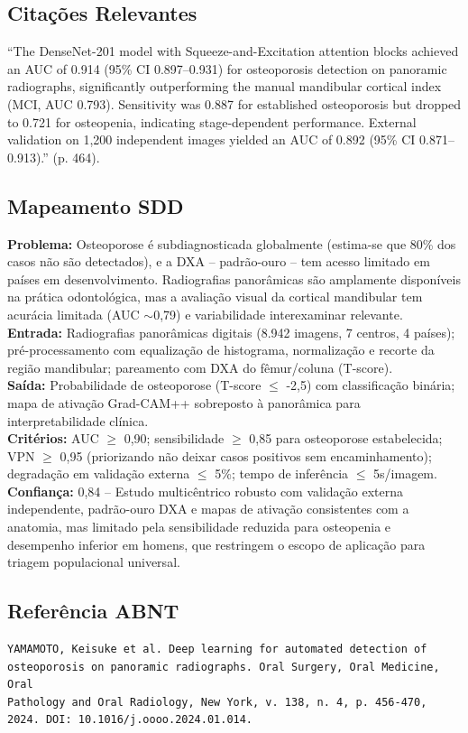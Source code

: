 \subsection{Citações Relevantes}
\begin{citacao}
``The DenseNet-201 model with Squeeze-and-Excitation attention blocks
achieved an AUC of 0.914 (95\% CI 0.897--0.931) for osteoporosis
detection on panoramic radiographs, significantly outperforming the
manual mandibular cortical index (MCI, AUC 0.793). Sensitivity was 0.887
for established osteoporosis but dropped to 0.721 for osteopenia,
indicating stage-dependent performance. External validation on 1,200
independent images yielded an AUC of 0.892 (95\% CI 0.871--0.913).''
(p. 464).
\end{citacao}

\subsection{Mapeamento SDD}
\textbf{Problema:} Osteoporose é subdiagnosticada globalmente (estima-se
que 80\% dos casos não são detectados), e a DXA -- padrão-ouro -- tem
acesso limitado em países em desenvolvimento. Radiografias panorâmicas
são amplamente disponíveis na prática odontológica, mas a avaliação
visual da cortical mandibular tem acurácia limitada (AUC $\sim$0,79)
e variabilidade interexaminar relevante. \\
\textbf{Entrada:} Radiografias panorâmicas digitais (8.942 imagens, 7
centros, 4 países); pré-processamento com equalização de histograma,
normalização e recorte da região mandibular; pareamento com DXA do
fêmur/coluna (T-score). \\
\textbf{Saída:} Probabilidade de osteoporose (T-score $\leq$ -2,5) com
classificação binária; mapa de ativação Grad-CAM++ sobreposto à
panorâmica para interpretabilidade clínica. \\
\textbf{Critérios:} AUC $\geq$ 0,90; sensibilidade $\geq$ 0,85 para
osteoporose estabelecida; VPN $\geq$ 0,95 (priorizando não deixar
casos positivos sem encaminhamento); degradação em validação externa
$\leq$ 5\%; tempo de inferência $\leq$ 5s/imagem. \\
\textbf{Confiança:} 0,84 -- Estudo multicêntrico robusto com validação
externa independente, padrão-ouro DXA e mapas de ativação consistentes
com a anatomia, mas limitado pela sensibilidade reduzida para osteopenia
e desempenho inferior em homens, que restringem o escopo de aplicação
para triagem populacional universal.

\subsection{Referência ABNT}
\begin{verbatim}
YAMAMOTO, Keisuke et al. Deep learning for automated detection of
osteoporosis on panoramic radiographs. Oral Surgery, Oral Medicine, Oral
Pathology and Oral Radiology, New York, v. 138, n. 4, p. 456-470,
2024. DOI: 10.1016/j.oooo.2024.01.014.
\end{verbatim}
\endinput
